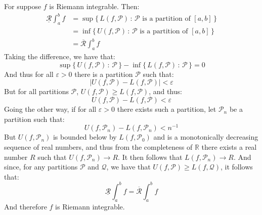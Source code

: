 \documentclass[crop=false,class=article]{standalone}                       %
\begin{document}
    \begin{solution}
        For suppose $f$ is Riemann integrable. Then:
        \begin{subequations}
            \begin{align}
                \underline{\mathcal{R}}\int_{a}^{b}f
                &=\sup\Big\{\,
                    L(f,\mathcal{P})\,:\,
                    \mathcal{P}\textrm{ is a partition of }[a,b]\,\Big\}\\
                &=\inf\Big\{\,
                    U(f,\mathcal{P})\,:\,
                    \mathcal{P}\textrm{ is a partition of }[a,b]\,\Big\}\\
                &=\overline{\mathcal{R}}\int_{a}^{b}f
            \end{align}
        \end{subequations}
        Taking the difference, we have that:
        \begin{equation}
            \sup\{\,U(f,\mathcal{P})\,:\,\mathcal{P}\,\}-
            \inf\{\,L(f,\mathcal{P})\,:\,\mathcal{P}\,\}=0
        \end{equation}
        And thus for all $\varepsilon>0$ there is a partition $\mathcal{P}$
        such that:
        \begin{equation}
            |U(f,\mathcal{P})-L(f,\mathcal{P})|<\varepsilon
        \end{equation}
        But for all partitions $\mathcal{P}$,
        $U(f,\mathcal{P})\geq{L}(f,\mathcal{P})$, and thus:
        \begin{equation}
            U(f,\mathcal{P})-L(f,\mathcal{P})<\varepsilon
        \end{equation}
        Going the other way, if for all $\varepsilon>0$ there exists such
        a partition, let $\mathcal{P}_{n}$ be a partition such that:
        \begin{equation}
            U(f,\mathcal{P}_{n})-L(f,\mathcal{P}_{n})<n^{\minus{1}}
        \end{equation}
        But $U(f,\mathcal{P}_{n})$ is bounded below by
        $L(f,\mathcal{P}_{0})$ and is a monotonically decreasing
        sequence of real numbers, and thus from the completeness of
        $\mathbb{R}$ there exists a real number $R$ such that
        $U(f,\mathcal{P}_{n})\rightarrow{R}$. It then follows that
        $L(f,\mathcal{P}_{n})\rightarrow{R}$. And since, for any partitions
        $\mathcal{P}$ and $\mathcal{Q}$, we have that
        $U(f,\mathcal{P})\geq{L}(f,\mathcal{Q})$, it follows that:
        \begin{equation}
            \underline{\mathcal{R}}\int_{a}^{b}f
            =\overline{\mathcal{R}}\int_{a}^{b}f
        \end{equation}
        And therefore $f$ is Riemann integrable.
    \end{solution}
\end{document}
